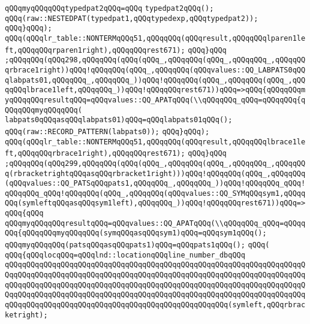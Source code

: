\verb|qQQqmyqQQqqQQqtypedpat2qQQq=qQQq|\newline
\verb|typedpat2qQQq();|\newline
\verb|qQQq(raw::NESTEDPAT(typedpat1,qQQqtypedexp,qQQqtypedpat2));|\newline
\verb|qQQq}qQQq);|\newline
\verb|qQQq(qQQqlr_table::NONTERMqQQq51,qQQqqQQq(qQQqresult,qQQqqQQqlparen1left,qQQqqQQqrparen1right),qQQqqQQqrest671);|\newline
\verb|qQQq}qQQq|\newline
\verb|;qQQqqQQq(qQQq298,qQQqqQQq(qQQq(qQQq_,qQQqqQQq(qQQq_,qQQqqQQq_,qQQqqQQqrbrace1right))qQQq!qQQqqQQq(qQQq_,qQQqqQQq(qQQqvalues::QQ_LABPATS0qQQqlabpats01,qQQqqQQq_,qQQqqQQq_))qQQq!qQQqqQQq(qQQq_,qQQqqQQq(qQQq_,qQQqqQQqlbrace1left,qQQqqQQq_))qQQq!qQQqqQQqrest671))qQQq=>qQQq{qQQqqQQqmyqQQqqQQqresultqQQq=qQQqvalues::QQ_APATqQQq(\\qQQqqQQq_qQQq=qQQqqQQq{qQQqqQQqmyqQQqqQQq(|\newline
\verb|labpats0qQQqasqQQqlabpats01)qQQq=qQQqlabpats01qQQq();|\newline
\verb|qQQq(raw::RECORD_PATTERN(labpats0));|\newline
\verb|qQQq}qQQq);|\newline
\verb|qQQq(qQQqlr_table::NONTERMqQQq51,qQQqqQQq(qQQqresult,qQQqqQQqlbrace1left,qQQqqQQqrbrace1right),qQQqqQQqrest671);|\newline
\verb|qQQq}qQQq|\newline
\verb|;qQQqqQQq(qQQq299,qQQqqQQq(qQQq(qQQq_,qQQqqQQq(qQQq_,qQQqqQQq_,qQQqqQQq(rbracketrightqQQqasqQQqrbracket1right)))qQQq!qQQqqQQq(qQQq_,qQQqqQQq(qQQqvalues::QQ_PATSqQQqpats1,qQQqqQQq_,qQQqqQQq_))qQQq!qQQqqQQq_qQQq!qQQqqQQq_qQQq!qQQqqQQq(qQQq_,qQQqqQQq(qQQqvalues::QQ_SYMqQQqsym1,qQQqqQQq(symleftqQQqasqQQqsym1left),qQQqqQQq_))qQQq!qQQqqQQqrest671))qQQq=>qQQq{qQQq|\newline
\verb|qQQqmyqQQqqQQqresultqQQq=qQQqvalues::QQ_APATqQQq(\\qQQqqQQq_qQQq=qQQqqQQq{qQQqqQQqmyqQQqqQQq(symqQQqasqQQqsym1)qQQq=qQQqsym1qQQq();|\newline
\verb|qQQqmyqQQqqQQq(patsqQQqasqQQqpats1)qQQq=qQQqpats1qQQq();|\newline
\verb|qQQq(|\newline
\verb|qQQq{qQQqlocqQQq=qQQqlnd::locationqQQqline_number_dbqQQq|\newline
\verb|qQQqqQQqqQQqqQQqqQQqqQQqqQQqqQQqqQQqqQQqqQQqqQQqqQQqqQQqqQQqqQQqqQQqqQQqqQQqqQQqqQQqqQQqqQQqqQQqqQQqqQQqqQQqqQQqqQQqqQQqqQQqqQQqqQQqqQQqqQQqqQQqqQQqqQQqqQQqqQQqqQQqqQQqqQQqqQQqqQQqqQQqqQQqqQQqqQQqqQQqqQQqqQQqqQQqqQQqqQQqqQQqqQQqqQQqqQQqqQQqqQQqqQQqqQQqqQQqqQQqqQQqqQQqqQQqqQQqqQQqqQQqqQQqqQQqqQQqqQQqqQQqqQQqqQQqqQQqqQQqqQQqqQQqqQQq(symleft,qQQqrbracketright);|\newline
